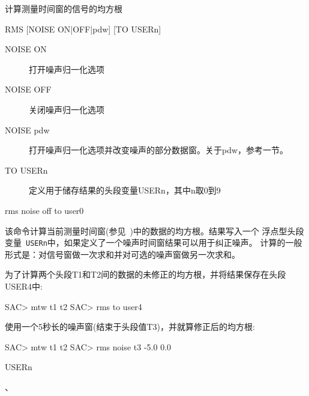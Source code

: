 \label{cmd:rms}

计算测量时间窗的信号的均方根

\begin{SACSTX}
RMS [NOISE ON|OFF|pdw] [TO USERn]
\end{SACSTX}

\begin{description}
\item [NOISE ON] 打开噪声归一化选项
\item [NOISE OFF] 关闭噪声归一化选项
\item [NOISE pdw] 打开噪声归一化选项并改变噪声的部分数据窗。关于pdw，参考一节。
\item [TO USERn] 定义用于储存结果的头段变量USERn，其中n取0到9
\end{description}

\begin{SACDFT}
rms noise off to user0
\end{SACDFT}

该命令计算当前测量时间窗(参见~)中的数据的均方根。结果写入一个
浮点型头段变量~\verb+USERn+中，如果定义了一个噪声时间窗结果可以用于纠正噪声。
计算的一般形式是：对信号窗做一次求和并对可选的噪声窗做另一次求和。

为了计算两个头段T1和T2间的数据的未修正的均方根，并将结果保存在头段USER4中:
\begin{SACCode}
SAC> mtw t1 t2
SAC> rms to user4
\end{SACCode}

使用一个5秒长的噪声窗(结束于头段值T3)，并就算修正后的均方根:
\begin{SACCode}
SAC> mtw t1 t2
SAC> rms noise t3 -5.0 0.0
\end{SACCode}

USERn

、
